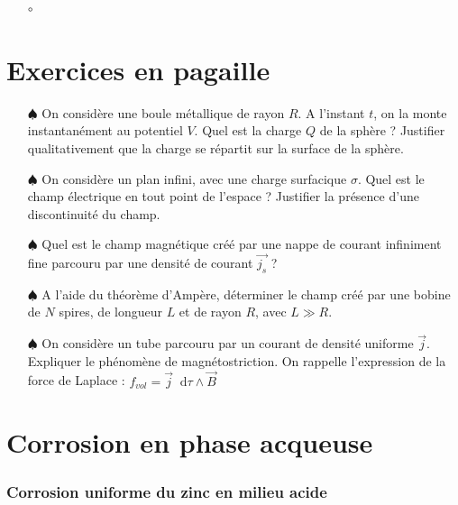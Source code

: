 \documentclass{report}
\newcommand*\dif{\mathop{}\!\mathrm{d}}
\begin{document}
\begin{itemize}

	\item[$\circ$] 

\end{itemize}

\newpage

\section*{Exercices en pagaille}

\begin{itemize}

	\item[$\spadesuit$] On considère une boule métallique de rayon $R$. A l'instant $t$, on la monte instantanément au potentiel $V$. Quel est la charge $Q$ de la sphère ? Justifier qualitativement que la charge se répartit sur la surface de la sphère.
	
	\item[$\spadesuit$] On considère un plan infini, avec une charge surfacique $\sigma$. Quel est le champ électrique en tout point de l'espace ? Justifier la présence d'une discontinuité du champ. 
	
	\item[$\spadesuit$] Quel est le champ magnétique créé par une nappe de courant infiniment fine parcouru par une densité de courant $\vec{j_s}$ ? 
	
	\item[$\spadesuit$] A l'aide du théorème d'Ampère, déterminer le champ créé par une bobine de $N$ spires, de longueur $L$ et de rayon $R$, avec $L\gg R$.
	
	\item[$\spadesuit$] On considère un tube parcouru par un courant de densité uniforme $\vec{j}$. Expliquer le phénomène de magnétostriction. On rappelle l'expression de la force de Laplace : $f_{vol}=\vec{j}\dif\tau\wedge\vec{B}$
	
\end{itemize}

\newpage

\section*{Corrosion en phase acqueuse}

\subsubsection*{Corrosion uniforme du zinc en milieu acide}
\end{document}
